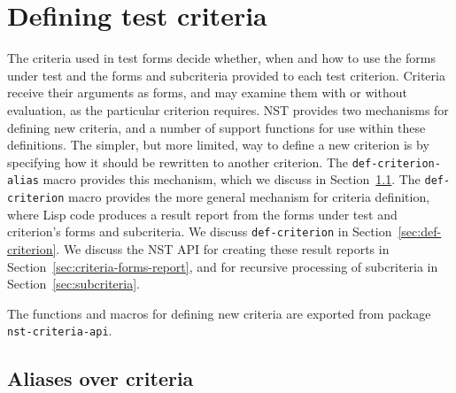 
\section{Defining test criteria}
The criteria used in test forms decide whether, when and how to use
the forms under test and the forms and subcriteria provided to each
test criterion.  Criteria receive their arguments as forms, and may
examine them with or without evaluation, as the particular criterion
requires.  NST provides two mechanisms for defining new criteria, and
a number of support functions for use within these definitions.  The
simpler, but more limited, way to define a new criterion is by
specifying how it should be rewritten to another criterion.  The
\texttt{def-criterion-alias} macro provides this mechanism, which we
discuss in Section~\ref{sec:def-criterion-alias}.  The
\texttt{def-criterion} macro provides the more general mechanism for
criteria definition, where Lisp code produces a result report from the
forms under test and criterion's forms and subcriteria.  We discuss
\texttt{def-criterion} in Section~\ref{sec:def-criterion}.  We discuss
the NST API for creating these result reports in
Section~\ref{sec:criteria-forms-report}, and for recursive processing
of subcriteria in Section~\ref{sec:subcriteria}.

The functions and macros for defining new criteria are exported from
package \texttt{nst-criteria-api}.

\subsection{Aliases over criteria}
\label{sec:def-criterion-alias}


